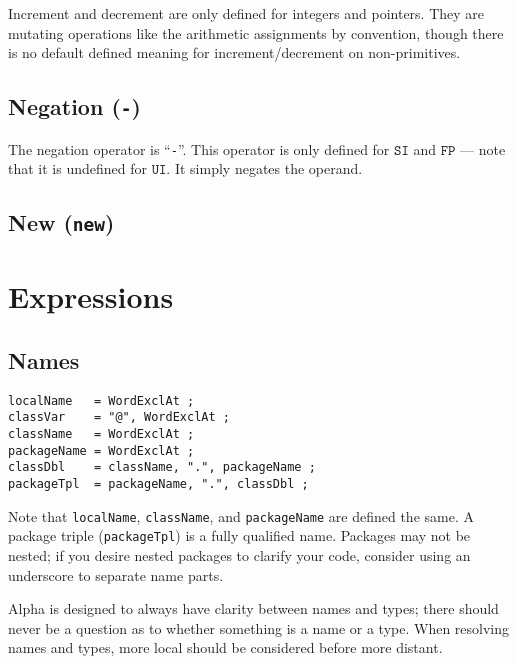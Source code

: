 \documentclass{article}
\newcommand{\R}[1]{\mathtt{#1}}
\begin{document}
Increment and decrement are only defined for integers and pointers. They are
mutating operations like the arithmetic assignments by convention, though there
is no default defined meaning for increment/decrement on non-primitives.

\subsection{Negation (\texttt{-})}
\label{sub:operators:neg}
The negation operator is ``\texttt{-}''. This operator is only defined for
$\R{SI}$ and $\R{FP}$ --- note that it is undefined for $\R{UI}$. It simply
negates the operand.

\subsection{New (\texttt{new})}
\label{sub:operators:new}

\section{Expressions}
\label{sec:expressions}

\subsection{Names}
\label{sub:expressions:names}
\begin{verbatim}
localName   = WordExclAt ;
classVar    = "@", WordExclAt ;
className   = WordExclAt ;
packageName = WordExclAt ;
classDbl    = className, ".", packageName ;
packageTpl  = packageName, ".", classDbl ;
\end{verbatim}

Note that \texttt{localName}, \texttt{className}, and \texttt{packageName} are
defined the same. A package triple (\texttt{packageTpl}) is a fully qualified
name. Packages may not be nested; if you desire nested packages to clarify your
code, consider using an underscore to separate name parts.

Alpha is designed to always have clarity between names and types; there should
never be a question as to whether something is a name or a type. When resolving
names and types, more local should be considered before more distant.

\end{document}
